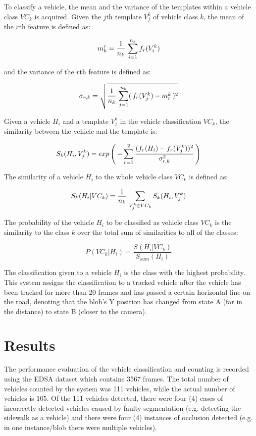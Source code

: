 \documentclass[conference]{IEEEtran}
\begin{document}
To classify a vehicle, the mean and the variance of the templates within a vehicle class $VC_k$ is acquired. Given the $j$th template $V_j^k$ of vehicle class $k$, the mean of the $r$th feature is defined as:

$$
m_k^r = \frac{1}{n_k} \thinspace \sum_{i=1}^{n_k} f_r (V_i^k)
$$

and the variance of the $r$th feature is defined as:

$$
\sigma_{r,k} = \sqrt{ \frac{1}{n_k} \thinspace \sum_{j=1}^{n_k} ( \thinspace f_r (V_j^k) - m_r^k \thinspace ) ^2 }
$$

Given a vehicle $H_i$ and a template $V_j^k$ in the vehicle classification $VC_k$, the similarity between the vehicle and the template is:

$$
S_k (H_i, V_j^k) = exp \left( \thinspace - \sum_{r=1}^{2} \frac{ (f_r(H_i) - f_r(V_j^k) )^2 }{\sigma_{r, k}^2 } \thinspace \right)
$$

The similarity of a vehicle $H_i$ to the whole vehicle class $VC_k$ is defined as:

$$
S_k (H_i | VC_k) = \frac{1}{n_k} \thinspace \sum_{V_j^k \in VC_k } S_k (H_i, V_j^k)
$$

The probability of the vehicle $H_i$ to be classified as vehicle class $VC_k$ is the similarity to the class $k$ over the total sum of similarities to all of the classes:

$$
P(VC_k | H_i) = \frac{S(H_i | VC_k)}{S_{sum} (H_i)}
$$


The classification given to a vehicle $H_i$ is the class with the highest probability. This system assigns the classification to a tracked vehicle after the vehicle has been tracked for more than 20 frames and has passed a certain horizontal line on the road, denoting that the blob's Y position has changed from state A (far in the distance) to state B (closer to the camera).

\section{Results}

The performance evaluation of the vehicle classification and counting is recorded using the EDSA dataset which contains 3567 frames. The total number of vehicles counted by the system was 111 vehicles, while the actual number of vehicles is 105. Of the 111 vehicles detected, there were four (4) cases of incorrectly detected vehicles caused by faulty segmentation (e.g. detecting the sidewalk as a vehicle) and there were four (4) instances of occlusion detected (e.g. in one instance/blob there were multiple vehicles).
\end{document}
